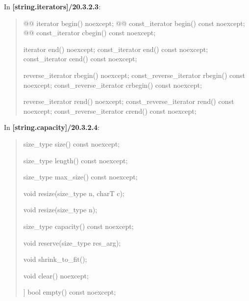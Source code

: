 \documentclass{wg21}
\begin{document}
In \textbf{[string.iterators]/20.3.2.3}:
\begin{quote}
\begin{itemdecl}
@@ iterator       begin() noexcept;
@@ const_iterator begin() const noexcept;
@@ const_iterator cbegin() const noexcept;
\end{itemdecl}

\begin{itemdecl}
iterator       end() noexcept;
const_iterator end() const noexcept;
const_iterator cend() const noexcept;
\end{itemdecl}

\begin{itemdecl}
reverse_iterator       rbegin() noexcept;
const_reverse_iterator rbegin() const noexcept;
const_reverse_iterator crbegin() const noexcept;
\end{itemdecl}

\begin{itemdecl}
reverse_iterator       rend() noexcept;
const_reverse_iterator rend() const noexcept;
const_reverse_iterator crend() const noexcept;
\end{itemdecl}
\end{quote}


In \textbf{[string.capacity]/20.3.2.4}:
\begin{quote}
\begin{itemdecl}
size_type size() const noexcept;
\end{itemdecl}

\begin{itemdecl}
size_type length() const noexcept;
\end{itemdecl}

\begin{itemdecl}
size_type max_size() const noexcept;
\end{itemdecl}

\begin{itemdecl}
void resize(size_type n, charT c);
\end{itemdecl}

\begin{itemdecl}
void resize(size_type n);
\end{itemdecl}

\begin{itemdecl}
size_type capacity() const noexcept;
\end{itemdecl}

\begin{itemdecl}
void reserve(size_type res_arg);
\end{itemdecl}

\begin{itemdecl}
void shrink_to_fit();
\end{itemdecl}

\begin{itemdecl}
void clear() noexcept;
\end{itemdecl}

\begin{itemdecl}
[[nodiscard]] bool empty() const noexcept;
\end{itemdecl}
\end{quote}
\end{document}
